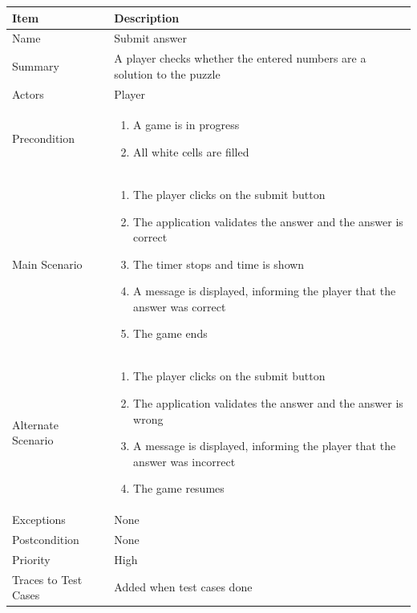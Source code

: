 \documentclass[12pt]{article}
\begin{document}
\begin{center}
\setlength{\tabcolsep}{16pt}
\renewcommand{\arraystretch}{1.1}
\begin{tabular}{ |p{3.4cm}|p{10cm}| }
    \hline
    \textbf{Item} & \textbf{Description} \\
    \hline
    Name & Submit answer \\
    \hline
    Summary & A player checks whether the entered numbers are a solution to the puzzle \\
    \hline
    Actors & Player \\
    \hline
    Precondition & 
    \vspace*{-0.1in}
    \begin{enumerate}[leftmargin=0.2in]
    \item A game is in progress
    \item All white cells are filled
    \end{enumerate}  \\
    \hline
    Main Scenario &     
    \vspace*{-0.1in}
    \begin{enumerate}[leftmargin=0.2in]
    \item The player clicks on the submit button
    \item The application validates the answer and the answer is correct
    \item The timer stops and time is shown
    \item A message is displayed, informing the player that the answer was correct
    \item The game ends
    \end{enumerate}  \\
    \hline
    Alternate Scenario & 
    \vspace*{-0.1in}
    \begin{enumerate}[leftmargin=0.2in]
    \item The player clicks on the submit button
    \item The application validates the answer and the answer is wrong
    \item A message is displayed, informing the player that the answer was incorrect
    \item The game resumes
    \end{enumerate}  \\
    \hline
    Exceptions &  None \\
    \hline
    Postcondition & None \\
    \hline
    Priority & High  \\
    \hline
    Traces to Test Cases & Added when test cases done  \\
    \hline
\end{tabular}
\end{center}
\end{document}
